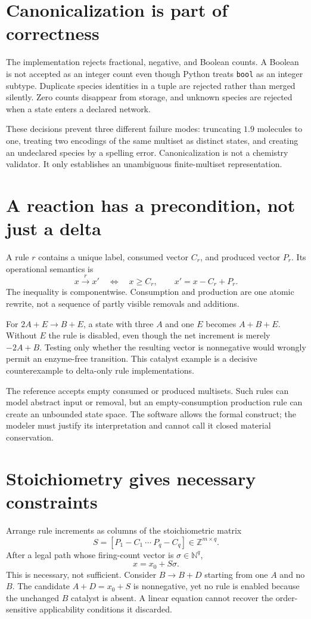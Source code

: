 \section{Canonicalization is part of correctness}
The implementation rejects fractional, negative, and Boolean counts. A Boolean is
not accepted as an integer count even though Python treats \texttt{bool} as an
integer subtype. Duplicate species identities in a tuple are rejected rather than
merged silently. Zero counts disappear from storage, and unknown species are
rejected when a state enters a declared network.

These decisions prevent three different failure modes: truncating $1.9$ molecules
to one, treating two encodings of the same multiset as distinct states, and creating
an undeclared species by a spelling error. Canonicalization is not a chemistry
validator. It only establishes an unambiguous finite-multiset representation.

\section{A reaction has a precondition, not just a delta}
A rule $r$ contains a unique label, consumed vector $C_r$, and produced vector
$P_r$. Its operational semantics is
\[
x\xrightarrow{r}x'\quad\Longleftrightarrow\quad
x\ge C_r,\qquad x'=x-C_r+P_r.
\]
The inequality is componentwise. Consumption and production are one atomic rewrite,
not a sequence of partly visible removals and additions.


For $2A+E\to B+E$, a state with three $A$ and one $E$ becomes $A+B+E$.
Without $E$ the rule is disabled, even though the net increment is merely
$-2A+B$. Testing only whether the resulting vector is nonnegative would wrongly
permit an enzyme-free transition. This catalyst example is a decisive
counterexample to delta-only rule implementations.

The reference accepts empty consumed or produced multisets. Such rules can model
abstract input or removal, but an empty-consumption production rule can create an
unbounded state space. The software allows the formal construct; the modeler must
justify its interpretation and cannot call it closed material conservation.

\section{Stoichiometry gives necessary constraints}
Arrange rule increments as columns of the stoichiometric matrix
\[
S=[P_1-C_1\ \cdots\ P_q-C_q]\in\mathbb Z^{m\times q}.
\]
After a legal path whose firing-count vector is $\sigma\in\mathbb N^q$,
\[
x=x_0+S\sigma.
\]
This  is necessary, not sufficient. Consider $B\to B+D$
starting from one $A$ and no $B$. The candidate $A+D=x_0+S$ is nonnegative, yet no
rule is enabled because the unchanged $B$ catalyst is absent. A linear equation
cannot recover the order-sensitive applicability conditions it discarded.

